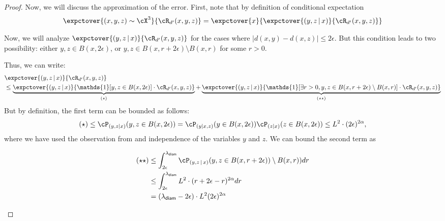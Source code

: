\begin{proof}
    
    Now, we will discuss the approximation of the error. First, note that by definition of conditional expectation
\begin{align*}
    \expctover{(x,y,z) \sim \cX^3}{\cR_{d'}(x,y,z)} = \expctover{x}{\expctover{(y,z\,|\,x)}{\cR_{d'}(x,y,z)}} 
\end{align*}

Now, we will analyze $\expctover{(y,z\,|\,x)}{\cR_{d'}(x,y,z)}$ for the cases where $|d(x,y) - d(x,z)| \le 2\epsilon$. But this condition leads to two possibility: either $y,z \in B(x,2\epsilon)$, or $y,z \in B(x,r + 2\epsilon)\setminus B(x,r)$ for some $r > 0$.


Thus, we can write:
\begin{align*}
    &\expctover{(y,z\,|\,x)}{\cR_{d'}(x,y,z)}\\
    &\le \underbrace{\expctover{(y,z\,|\,x)}{\mathds{1}[y,z \in B(x,2\epsilon)]\cdot \cR_{d'}(x,y,z)}}_{(\star)} + \underbrace{\expctover{(y,z\,|\,x)}{\mathds{1}[\exists r>0, y,z \in B(x,r + 2\epsilon)\setminus B(x,r)]\cdot\cR_{d'}(x,y,z)}}_{(\star \star)}
\end{align*}
But by definition, the first term can be bounded as follows:
\begin{align*}
    (\star) \le \cP_{(y,z|x)} (y,z \in B(x,2\epsilon)) = \cP_{(y|x,z)} (y \in B(x,2\epsilon)) \cP_{(z|x)} (z \in B(x,2\epsilon)) \le L^2\cdot (2\epsilon)^{2\alpha},
\end{align*}
where we have used the observation from  and independence of the variables $y$ and $z$. We can bound the second term as
\begin{center}
\begin{align*}
    (\star \star) &\le   \int_{2\epsilon}^{\lambda_{\textsf{diam}}} \cP_{(y,z\,|\, x)}( y,z \in B(x,r+2\epsilon))\setminus B(x,r)) d r\\
    & \le \int_{2\epsilon}^{\lambda_{\textsf{diam}}} L^2\cdot (r + 2\epsilon  - r )^{2\alpha} dr\\
    &= (\lambda_{\textsf{diam}} - 2\epsilon)\cdot L^2(2\epsilon)^{2\alpha}\\ 

\end{align*}
\end{center}
\end{proof}
